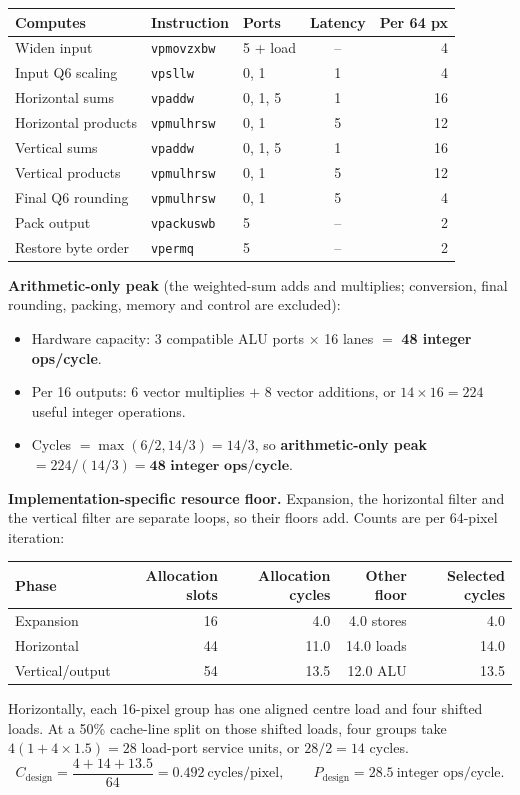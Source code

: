 \documentclass[10pt]{article}
\begin{document}
\begin{center}\small
\begin{tabular}{lllcr}
\toprule
Computes & Instruction & Ports & Latency & Per 64 px \\
\midrule
Widen input & \texttt{vpmovzxbw} & 5 + load & -- & 4 \\
Input Q6 scaling & \texttt{vpsllw} & 0, 1 & 1 & 4 \\
Horizontal sums & \texttt{vpaddw} & 0, 1, 5 & 1 & 16 \\
Horizontal products & \texttt{vpmulhrsw} & 0, 1 & 5 & 12 \\
Vertical sums & \texttt{vpaddw} & 0, 1, 5 & 1 & 16 \\
Vertical products & \texttt{vpmulhrsw} & 0, 1 & 5 & 12 \\
Final Q6 rounding & \texttt{vpmulhrsw} & 0, 1 & 5 & 4 \\
Pack output & \texttt{vpackuswb} & 5 & -- & 2 \\
Restore byte order & \texttt{vpermq} & 5 & -- & 2 \\
\bottomrule
\end{tabular}
\end{center}

\textbf{Arithmetic-only peak} (the weighted-sum adds and multiplies; conversion, final rounding, packing, memory and control are excluded):
\begin{itemize}
\item Hardware capacity: 3 compatible ALU ports $\times$ 16 lanes $=$ \textbf{48 integer ops/cycle}.
\item Per 16 outputs: 6 vector multiplies $+$ 8 vector additions, or $14\times16=224$ useful integer operations.
\item Cycles $=\max(6/2,14/3)=14/3$, so \textbf{arithmetic-only peak} $=224/(14/3)=\textbf{48 integer ops/cycle}$.
\end{itemize}

\textbf{Implementation-specific resource floor.} Expansion, the horizontal filter and the vertical filter are separate loops, so their floors add. Counts are per 64-pixel iteration:
\begin{center}\small
\begin{tabular}{lrrrr}
\toprule
Phase & Allocation slots & Allocation cycles & Other floor & Selected cycles \\
\midrule
Expansion & 16 & 4.0 & 4.0 stores & 4.0 \\
Horizontal & 44 & 11.0 & 14.0 loads & 14.0 \\
Vertical/output & 54 & 13.5 & 12.0 ALU & 13.5 \\
\bottomrule
\end{tabular}
\end{center}
Horizontally, each 16-pixel group has one aligned centre load and four shifted loads. At a 50\% cache-line split on those shifted loads, four groups take $4(1+4\times1.5)=28$ load-port service units, or $28/2=14$ cycles.
\[
C_{\mathrm{design}}=\frac{4+14+13.5}{64}=\boxed{0.492\ \text{cycles/pixel}},\qquad
P_{\mathrm{design}}=\boxed{28.5\ \text{integer ops/cycle}}.
\]
\end{document}
